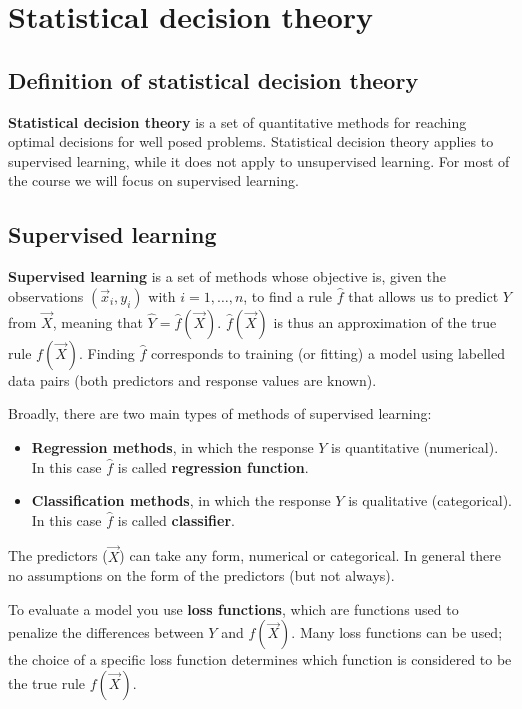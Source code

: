 \chapter{Statistical decision theory}
  
  \section{Definition of statistical decision theory}
    \textbf{Statistical decision theory} is a set of quantitative methods for reaching optimal decisions for well posed problems. Statistical decision theory applies to supervised learning, while it does not apply to unsupervised learning. For most of the course we will focus on supervised learning. 

  \section{Supervised learning}
    \textbf{Supervised learning} is a set of methods whose objective is, given the observations $(\vec{x}_i, y_i)$ with $i = 1, \dots, n$, to find a rule $\hat{f}$ that allows us to predict $Y$ from $\vec{X}$, meaning that $\hat{Y} = \hat{f}(\vec{X})$. $\hat{f}(\vec{X})$ is thus an approximation of the true rule $f(\vec{X})$. Finding $\hat{f}$ corresponds to training (or fitting) a model using labelled data pairs (both predictors and response values are known).

    Broadly, there are two main types of methods of supervised learning: 
    \begin{itemize}
      \item \textbf{Regression methods}, in which the response $Y$ is quantitative (numerical). In this case $\hat{f}$ is called \textbf{regression function}.
      \item \textbf{Classification methods}, in which the response $Y$ is qualitative (categorical). In this case $\hat{f}$ is called \textbf{classifier}.
    \end{itemize}
    
    The predictors ($\vec{X}$) can take any form, numerical or categorical. In general there no assumptions on the form of the predictors (but not always).
    
    To evaluate a model you use \textbf{loss functions}, which are functions used to penalize the differences between $Y$ and $f(\vec{X})$. Many loss functions can be used; the choice of a specific loss function determines which function is considered to be the true rule $f(\vec{X})$.

